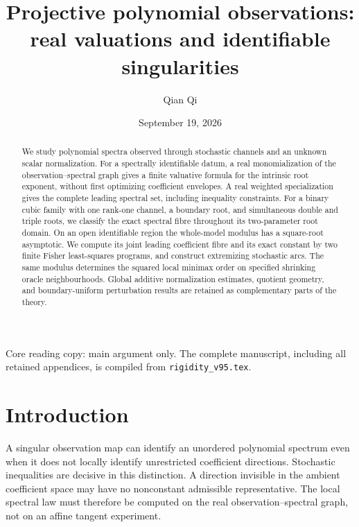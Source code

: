 \documentclass[11pt,reqno]{amsart}
\title[Real valuations and identifiable singularities]{Projective polynomial observations:\\ real valuations and identifiable singularities}
\author{Qian Qi}
\date{September 19, 2026}
\numberwithin{equation}{section}
\theoremstyle{definition}\newtheorem{definition}[theorem]{Definition}
\theoremstyle{remark}\newtheorem{remark}[theorem]{Remark}
\begin{document}
\begin{abstract}
We study polynomial spectra observed through stochastic channels and
an unknown scalar normalization. For a spectrally identifiable datum,
a real monomialization of the observation--spectral graph gives a finite
valuative formula for the intrinsic root exponent, without first
optimizing coefficient envelopes. A real weighted specialization gives
the complete leading spectral set, including inequality constraints.
For a binary cubic family with one rank-one channel, a boundary root,
and simultaneous double and triple roots, we classify the exact spectral
fibre throughout its two-parameter root domain. On an open identifiable
region the whole-model modulus has a square-root asymptotic. We compute
its joint leading coefficient fibre and its exact constant by two finite
Fisher least-squares programs, and construct extremizing stochastic arcs.
The same modulus determines the squared local minimax order on specified
shrinking oracle neighbourhoods. Global additive normalization estimates,
quotient geometry, and boundary-uniform perturbation results are retained
as complementary parts of the theory.
\end{abstract}
\maketitle
\ifdefined\AIIcoreonly
\begin{center}\small Core reading copy: main argument only. The complete
manuscript, including all retained appendices, is compiled from
\texttt{rigidity\_v95.tex}.\end{center}
\fi

\section{Introduction}
A singular observation map can identify an unordered polynomial spectrum
even when it does not locally identify unrestricted coefficient
directions. Stochastic inequalities are decisive in this distinction.
A direction invisible in the ambient coefficient space may have no
nonconstant admissible representative. The local spectral law must
therefore be computed on the real observation--spectral graph, not on
an affine tangent experiment.
\end{document}
